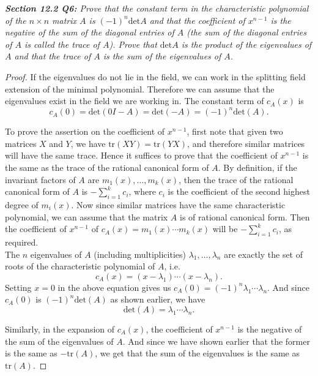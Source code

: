 \documentclass{article}
\begin{document}
\it \textbf{Section 12.2 Q6:} Prove that the constant term in the
  characteristic polynomial of the $n\times n$ matrix $A$ is
  $(-1)^n\text{det}A$ and that the coefficient of $x^{n-1}$ is the negative
  of the sum of the diagonal entries of $A$ (the sum of the diagonal
  entries of $A$ is called the trace of $A$). Prove that $\text{det}A$ is
  the product of the eigenvalues of $A$ and that the trace of $A$ is the
  sum of the eigenvalues of $A$.

  \begin{proof}
    If the eigenvalues do not lie in the field, we can work in the
    splitting field extension of the minimal polynomial. Therefore we can
    assume that the eigenvalues exist in the field we are working in. The
    constant term of $c_A(x)$ is
    \[c_A(0)=\text{det}(0I-A)=\text{det}(-A)=(-1)^n\text{det}(A).\]

    To prove the assertion on the coefficient of $x^{n-1}$, first note that
    given two matrices $X$ and $Y$, we have $\text{tr}(XY)=\text{tr}(YX)$,
    and therefore similar matrices will have the same trace. Hence it
    suffices to prove that the coefficient of $x^{n-1}$ is the same as the
    trace of the rational canonical form of $A$. By definition, if the
    invariant factors of $A$ are $m_1(x),\ldots,m_k(x)$, then the trace of
    the rational canonical form of $A$ is $-\sum_{i=1}^k c_{i}$, where
    $c_{i}$ is the coefficient of the second highest degree of $m_i(x)$.
    Now since similar matrices have the same characteristic polynomial, we
    can assume that the matrix $A$ is of rational canonical form. Then the
    coefficient of $x^{n-1}$ of $c_A(x)=m_1(x)\cdots m_k(x)$ will be
    $-\sum_{i=1}^k c_{i}$, as required. \\

    The $n$ eigenvalues of $A$ (including multiplicities)
    $\lambda_1,\ldots,\lambda_n$ are exactly the set of
    roots of the characteristic polynomial of $A$, i.e.
    \[c_A(x) =(x-\lambda_1)\cdots(x-\lambda_n).\]
    Setting $x=0$ in the above equation gives us
    $c_A(0)=(-1)^n\lambda_1\cdots\lambda_n$. And since $c_A(0)$ is
    $(-1)^n\text{det}(A)$ as shown earlier, we have
    \[\text{det}(A) =\lambda_1\cdots\lambda_n.\]

    Similarly, in the expansion of $c_A(x)$, the coefficient of $x^{n-1}$
    is the negative of the sum of the eigenvalues of $A$. And since we have
    shown earlier that the former is the same as $-\text{tr}(A)$, we get
    that the sum of the eigenvalues is the same as $\text{tr}(A)$.
  \end{proof}
\end{document}

